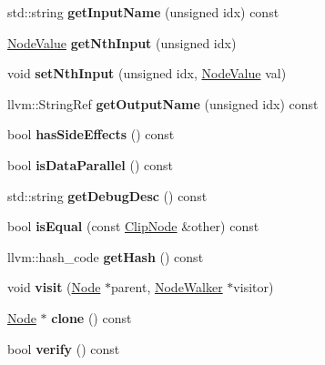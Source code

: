 \begin{DoxyCompactItemize}
std\+::string {\bfseries get\+Input\+Name} (unsigned idx) const
\item 
\mbox{\label{classglow_1_1_clip_node_ab9b8bfa6b2a52c650551a9cd198f64e8}} 
\hyperlink{structglow_1_1_node_value}{Node\+Value} {\bfseries get\+Nth\+Input} (unsigned idx)
\item 
\mbox{\label{classglow_1_1_clip_node_a2931c95ac57c9904c59b578e42b82063}} 
void {\bfseries set\+Nth\+Input} (unsigned idx, \hyperlink{structglow_1_1_node_value}{Node\+Value} val)
\item 
\mbox{\label{classglow_1_1_clip_node_aaa52d1211c2c19439218aad2ecaafd17}} 
llvm\+::\+String\+Ref {\bfseries get\+Output\+Name} (unsigned idx) const
\item 
\mbox{\label{classglow_1_1_clip_node_a45a6754e40f75fe6b13b05af4a37a54b}} 
bool {\bfseries has\+Side\+Effects} () const
\item 
\mbox{\label{classglow_1_1_clip_node_a5bda5e8e7c62f4dfc52e7e1e393e492d}} 
bool {\bfseries is\+Data\+Parallel} () const
\item 
\mbox{\label{classglow_1_1_clip_node_ac0ae1e608ab69522ee4c7ee8d031e156}} 
std\+::string {\bfseries get\+Debug\+Desc} () const
\item 
\mbox{\label{classglow_1_1_clip_node_a007ab1da444134df0599b95e838de81b}} 
bool {\bfseries is\+Equal} (const \hyperlink{classglow_1_1_clip_node}{Clip\+Node} \&other) const
\item 
\mbox{\label{classglow_1_1_clip_node_a09ca5588c2570c49910348bff4c4cefd}} 
llvm\+::hash\+\_\+code {\bfseries get\+Hash} () const
\item 
\mbox{\label{classglow_1_1_clip_node_a603e46f51f84b7549714193ca84c6fcd}} 
void {\bfseries visit} (\hyperlink{classglow_1_1_node}{Node} $\ast$parent, \hyperlink{classglow_1_1_node_walker}{Node\+Walker} $\ast$visitor)
\item 
\mbox{\label{classglow_1_1_clip_node_ab08531ebef2c46fabff9c29523381db4}} 
\hyperlink{classglow_1_1_node}{Node} $\ast$ {\bfseries clone} () const
\item 
\mbox{\label{classglow_1_1_clip_node_a30b105da1ea3da3935ab69200f1a9f54}} 
bool {\bfseries verify} () const
\end{DoxyCompactItemize}

